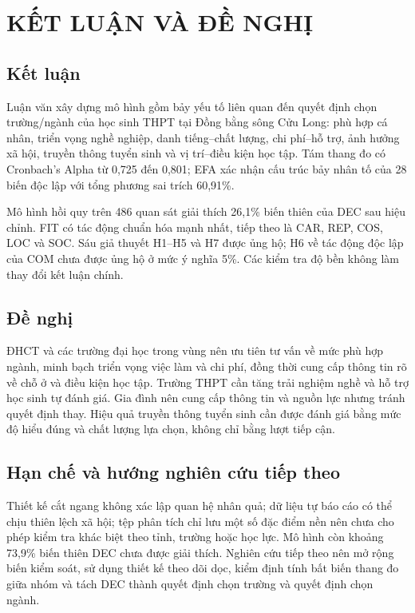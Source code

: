\chapter*{KẾT LUẬN VÀ ĐỀ NGHỊ}
\section*{Kết luận}
Luận văn xây dựng mô hình gồm bảy yếu tố liên quan đến quyết định chọn trường/ngành của học sinh THPT tại Đồng bằng sông Cửu Long: phù hợp cá nhân, triển vọng nghề nghiệp, danh tiếng--chất lượng, chi phí--hỗ trợ, ảnh hưởng xã hội, truyền thông tuyển sinh và vị trí--điều kiện học tập. Tám thang đo có Cronbach's Alpha từ 0,725 đến 0,801; EFA xác nhận cấu trúc bảy nhân tố của 28 biến độc lập với tổng phương sai trích 60,91\%.

Mô hình hồi quy trên 486 quan sát giải thích 26,1\% biến thiên của DEC sau hiệu chỉnh. FIT có tác động chuẩn hóa mạnh nhất, tiếp theo là CAR, REP, COS, LOC và SOC. Sáu giả thuyết H1--H5 và H7 được ủng hộ; H6 về tác động độc lập của COM chưa được ủng hộ ở mức ý nghĩa 5\%. Các kiểm tra độ bền không làm thay đổi kết luận chính.

\section*{Đề nghị}
ĐHCT và các trường đại học trong vùng nên ưu tiên tư vấn về mức phù hợp ngành, minh bạch triển vọng việc làm và chi phí, đồng thời cung cấp thông tin rõ về chỗ ở và điều kiện học tập. Trường THPT cần tăng trải nghiệm nghề và hỗ trợ học sinh tự đánh giá. Gia đình nên cung cấp thông tin và nguồn lực nhưng tránh quyết định thay. Hiệu quả truyền thông tuyển sinh cần được đánh giá bằng mức độ hiểu đúng và chất lượng lựa chọn, không chỉ bằng lượt tiếp cận.

\section*{Hạn chế và hướng nghiên cứu tiếp theo}
Thiết kế cắt ngang không xác lập quan hệ nhân quả; dữ liệu tự báo cáo có thể chịu thiên lệch xã hội; tệp phân tích chỉ lưu một số đặc điểm nền nên chưa cho phép kiểm tra khác biệt theo tỉnh, trường hoặc học lực. Mô hình còn khoảng 73,9\% biến thiên DEC chưa được giải thích. Nghiên cứu tiếp theo nên mở rộng biến kiểm soát, sử dụng thiết kế theo dõi dọc, kiểm định tính bất biến thang đo giữa nhóm và tách DEC thành quyết định chọn trường và quyết định chọn ngành.
